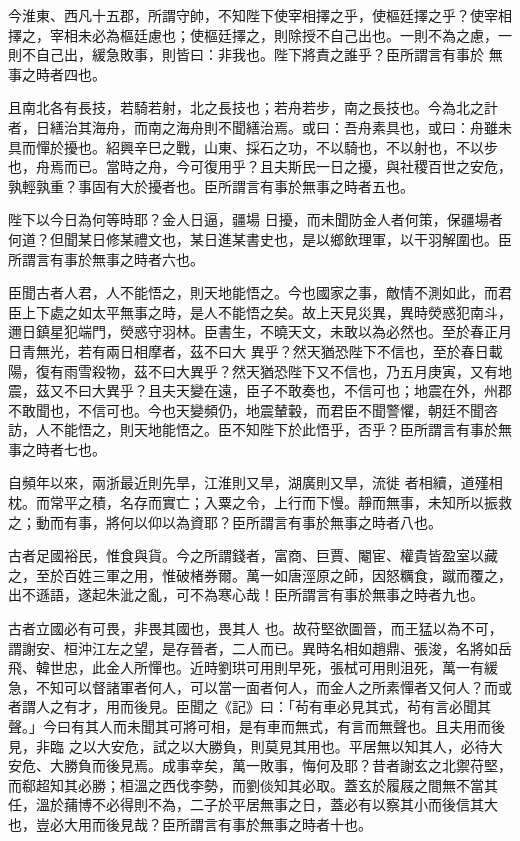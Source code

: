 \begin{pinyinscope}
 今淮東、西凡十五郡，所謂守帥，不知陛下使宰相擇之乎，使樞廷擇之乎？使宰相擇之，宰相未必為樞廷慮也；使樞廷擇之，則除授不自己出也。一則不為之慮，一則不自己出，緩急敗事，則皆曰：非我也。陛下將責之誰乎？臣所謂言有事於
 無事之時者四也。



 且南北各有長技，若騎若射，北之長技也；若舟若步，南之長技也。今為北之計者，日繕治其海舟，而南之海舟則不聞繕治焉。或曰：吾舟素具也，或曰：舟雖未具而憚於擾也。紹興辛巳之戰，山東、採石之功，不以騎也，不以射也，不以步也，舟焉而已。當時之舟，今可復用乎？且夫斯民一日之擾，與社稷百世之安危，孰輕孰重？事固有大於擾者也。臣所謂言有事於無事之時者五也。



 陛下以今日為何等時耶？金人日逼，疆場
 日擾，而未聞防金人者何策，保疆場者何道？但聞某日修某禮文也，某日進某書史也，是以鄉飲理軍，以干羽解圍也。臣所謂言有事於無事之時者六也。



 臣聞古者人君，人不能悟之，則天地能悟之。今也國家之事，敵情不測如此，而君臣上下處之如太平無事之時，是人不能悟之矣。故上天見災異，異時熒惑犯南斗，邇日鎮星犯端門，熒惑守羽林。臣書生，不曉天文，未敢以為必然也。至於春正月日青無光，若有兩日相摩者，茲不曰大
 異乎？然天猶恐陛下不信也，至於春日載陽，復有雨雪殺物，茲不曰大異乎？然天猶恐陛下又不信也，乃五月庚寅，又有地震，茲又不曰大異乎？且夫天變在遠，臣子不敢奏也，不信可也；地震在外，州郡不敢聞也，不信可也。今也天變頻仍，地震輦轂，而君臣不聞警懼，朝廷不聞咨訪，人不能悟之，則天地能悟之。臣不知陛下於此悟乎，否乎？臣所謂言有事於無事之時者七也。



 自頻年以來，兩浙最近則先旱，江淮則又旱，湖廣則又旱，流徙
 者相續，道殣相枕。而常平之積，名存而實亡；入粟之令，上行而下慢。靜而無事，未知所以振救之；動而有事，將何以仰以為資耶？臣所謂言有事於無事之時者八也。



 古者足國裕民，惟食與貨。今之所謂錢者，富商、巨賈、閹宦、權貴皆盈室以藏之，至於百姓三軍之用，惟破楮券爾。萬一如唐涇原之師，因怒糲食，蹴而覆之，出不遜語，遂起朱泚之亂，可不為寒心哉！臣所謂言有事於無事之時者九也。



 古者立國必有可畏，非畏其國也，畏其人
 也。故苻堅欲圖晉，而王猛以為不可，謂謝安、桓沖江左之望，是存晉者，二人而已。異時名相如趙鼎、張浚，名將如岳飛、韓世忠，此金人所憚也。近時劉珙可用則早死，張栻可用則沮死，萬一有緩急，不知可以督諸軍者何人，可以當一面者何人，而金人之所素憚者又何人？而或者謂人之有才，用而後見。臣聞之《記》曰：「茍有車必見其式，茍有言必聞其聲。」今曰有其人而未聞其可將可相，是有車而無式，有言而無聲也。且夫用而後見，非臨
 之以大安危，試之以大勝負，則莫見其用也。平居無以知其人，必待大安危、大勝負而後見焉。成事幸矣，萬一敗事，悔何及耶？昔者謝玄之北禦苻堅，而郗超知其必勝；桓溫之西伐李勢，而劉倓知其必取。蓋玄於履屐之間無不當其任，溫於蒱博不必得則不為，二子於平居無事之日，蓋必有以察其小而後信其大也，豈必大用而後見哉？臣所謂言有事於無事之時者十也。




\end{pinyinscope}
